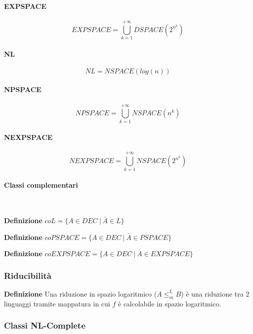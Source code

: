 \documentclass{article}
\begin{document}
\paragraph{EXPSPACE}

$$EXPSPACE=\bigcup_{k=1}^{+\infty}DSPACE(2^{n^k})$$\newline

\paragraph{NL}

$$NL=NSPACE(log(n))$$\newline

\paragraph{NPSPACE}

$$NPSPACE=\bigcup_{k=1}^{+\infty}NSPACE(n^k)$$\newline

\paragraph{NEXPSPACE}

$$NEXPSPACE=\bigcup_{k=1}^{+\infty}NSPACE(2^{n^k})$$

\paragraph{Classi complementari} $\ $\newline

\noindent\textbf{Definizione} $coL=\{A\in DEC\ |\ \bar{A}\in L\}$\newline

\noindent\textbf{Definizione} $coPSPACE=\{A\in DEC\ |\ \bar{A}\in PSPACE\}$\newline

\noindent\textbf{Definizione} $coEXPSPACE=\{A\in DEC\ |\ \bar{A}\in EXPSPACE\}$

\subsubsection{Riducibilità}

\textbf{Definizione} Una riduzione in spazio logaritmico ($A\leq_m^L B$) è una riduzione tra 2 linguaggi tramite mappatura in cui $f$ è calcolabile in spazio logaritmico.\newline

\subsubsection{Classi NL-Complete}
\end{document}
